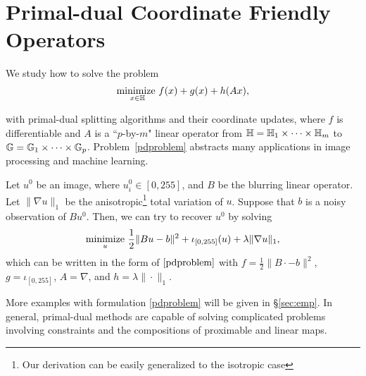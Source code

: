 \section{Primal-dual Coordinate Friendly Operators}\label{sec:p-d}
{We study how to solve the  problem
\begin{equation}
\underset{x\in\mathbb{H}}{\text{\normalfont minimize }} f(x)+g(x)+h(Ax),\label{pdproblem}
\end{equation}
{with primal-dual splitting algorithms and their coordinate updates, where $f$ is differentiable %
and $A$ is a ``$p$-by-$m$" linear operator from $\mathbb{H}=\mathbb{H}_1\times\cdots\times\mathbb{H}_m$ to $\mathbb{G}=\mathbb{G}_1\times\cdots\times\mathbb{G}_p$.
 Problem~\eqref{pdproblem} abstracts many applications in image processing and machine learning.
\begin{example}
Let $u^0$ be an image, where $u_i^0\in[0,255]$, and $B$ be the blurring linear operator. Let $\|\nabla u\|_1$ be the anisotropic\footnote{Our derivation can be easily generalized to the isotropic case} total variation of $u$. Suppose that $b$ is a noisy observation of $Bu^0$. Then, we can try to recover $u^0$ by solving 
\begin{equation}
\Min_u\, \frac{1}{2}\|Bu-b\|^2+\iota_{[0,255]}(u)+\lambda\|\nabla u\|_1,
\end{equation}
which can be written in the form of $\eqref{pdproblem}$ with $f=\frac{1}{2}\|B\cdot-b\|^2$, $g=\iota_{[0,255]}$, $A=\nabla$, and $h=\lambda\|\cdot\|_{1}$.
\end{example}
More examples with formulation \eqref{pdproblem} will be given in \S\ref{sec:emp}. %
In general, primal-dual methods are capable of solving complicated problems involving constraints and the compositions of proximable and linear maps.

}}
